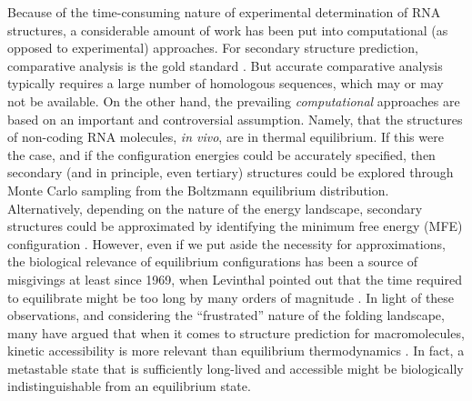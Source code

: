 \documentclass[10pt,letterpaper]{article}
\begin{document}
Because of the time-consuming nature of experimental determination of RNA structures, a considerable amount of work has been put into computational (as opposed to experimental) approaches. For secondary structure prediction, comparative analysis is the gold standard  \cite{Gutell1992-hu}. But accurate comparative analysis typically requires a large number of homologous sequences, which may or may not be available. On the other hand, the prevailing {\em computational} approaches are based on an important and controversial assumption\cite{Flamm2008-ir}. Namely, that the structures of  non-coding RNA molecules, {\em in vivo}, are in thermal equilibrium. If this were the case, and if the configuration energies could be accurately specified, then secondary (and in principle, even tertiary) structures could be explored through Monte Carlo sampling from the Boltzmann equilibrium distribution. Alternatively, depending on the nature of the energy landscape, secondary structures could be approximated by identifying the minimum free energy (MFE) configuration  \cite{Mathews1999-hc,Zuker1999-rc}. However, even if we put aside the necessity for approximations, the biological relevance of equilibrium configurations has been a source of misgivings at least since 1969, when Levinthal pointed out that the time required to equilibrate might be too long by many orders of magnitude  \cite{Levinthal1969-hi}. In light of these observations, and considering the ``frustrated'' nature of the folding landscape, many have argued that when it comes to structure prediction for macromolecules, kinetic accessibility is more relevant than equilibrium thermodynamics  \cite{Higgs2000-gj,Flamm2008-ir,Baker1994-px}. In fact, a metastable state that is sufficiently long-lived and accessible might be biologically indistinguishable from an equilibrium state.
\end{document}
